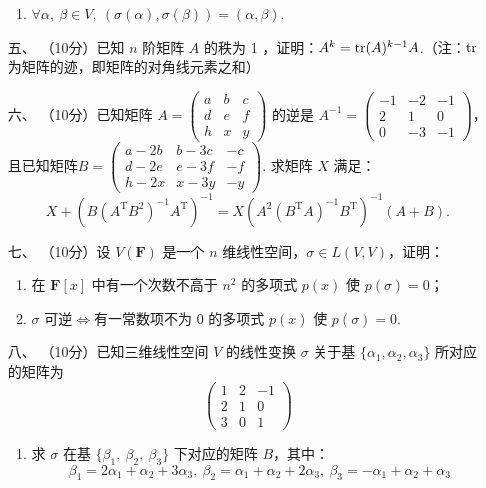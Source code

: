 \begin{enumerate}
\begin{enumerate}
        \item $\forall \alpha,\ \beta \in V,\ \left(\sigma (\alpha),\sigma (\beta) \right)=\left(\alpha,\beta\right)$.
    \end{enumerate}
	\item[五、]（10分）已知 $n$ 阶矩阵 $A$ 的秩为 1 ，证明：$A^k=\textup{tr}(A)^{k-1}A$.（注：$\textup{tr}$ 为矩阵的迹，即矩阵的对角线元素之和）
	\item[六、] （10分）已知矩阵 $A=\begin{pmatrix}a & b & c \\ d & e & f \\ h & x & y\end{pmatrix}$ 的逆是 $A^{-1}=\begin{pmatrix}-1 & -2 & -1 \\ 2 & 1 & 0 \\ 0 & -3 & -1\end{pmatrix}$，且已知矩阵$B=\begin{pmatrix}a-2b & b-3c & -c \\ d-2e & e-3f & -f \\ h-2x & x-3y & -y\end{pmatrix}$. 求矩阵 $X$ 满足：
    \[X+(B(A^\mathrm{T}B^2)^{-1}A^\mathrm{T})^{-1}=X(A^2(B^\mathrm{T}A)^{-1}B^\mathrm{T})^{-1}(A+B).\]
	\item[七、]（10分）设 $V(\mathbf{F})$ 是一个 $n$ 维线性空间，$\sigma \in L(V,V)$，证明：
    \begin{enumerate}[label=(\arabic*)]
        \item 在 $\mathbf{F}[x]$ 中有一个次数不高于 $n^2$ 的多项式 $p(x)$ 使 $p(\sigma)=0$；

        \item $\sigma$ 可逆$\iff$有一常数项不为 0 的多项式 $p(x)$ 使 $p(\sigma)=0$.
    \end{enumerate}

\item[八、]（10分）已知三维线性空间 $V$ 的线性变换 $\sigma$ 关于基 $\{\alpha_1,\alpha_2,\alpha_3\}$ 所对应的矩阵为
    \[\begin{pmatrix}1 & 2 & -1 \\ 2 & 1 & 0 \\ 3 & 0 & 1\end{pmatrix}\]
    \begin{enumerate}[label=(\arabic*)]
        \item 求 $\sigma$ 在基 $\{\beta_1,\ \beta_2,\ \beta_3\}$ 下对应的矩阵 $B$，其中：
        \[\beta_1=2\alpha_1+\alpha_2+3\alpha_3,\ \beta_2=\alpha_1+\alpha_2+2\alpha_3,\ \beta_3=-\alpha_1+\alpha_2+\alpha_3\]


\end{enumerate}
\end{enumerate}
